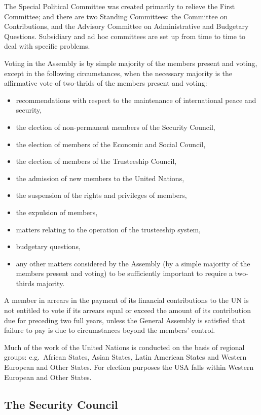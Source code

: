\documentclass[
  openany]{book}
\providecommand{\tightlist}{%
  \setlength{\itemsep}{0pt}\setlength{\parskip}{0pt}}
\begin{document}
The Special Political Committee was created primarily to relieve the First Committee; and there are two Standing Committees: the Committee on Contributions, and the Advisory Committee on Administrative and Budgetary Questions. Subsidiary and ad hoc committees are set up from time to time to deal with specific problems.

Voting in the Assembly is by simple majority of the members present and voting, except in the following circumstances, when the necessary majority is the affirmative vote of two-thrids of the members present and voting:

\begin{itemize}
\tightlist
\item
  recommendations with respect to the maintenance of international peace and security,
\item
  the election of non-permanent members of the Security Council,
\item
  the election of members of the Economic and Social Council,
\item
  the election of members of the Trusteeship Council,
\item
  the admission of new members to the United Nations,
\item
  the suspension of the rights and privileges of members,
\item
  the expulsion of members,
\item
  matters relating to the operation of the trusteeship system,
\item
  budgetary questions,
\item
  any other matters considered by the Assembly (by a simple majority of the members present and voting) to be sufficiently important to require a two-thirds majority.
\end{itemize}

A member in arrears in the payment of its financial contributions to the UN is not entitled to vote if its arrears equal or exceed the amount of its contribution due for preceding two full years, unless the General Assembly is satisfied that failure to pay is due to circumstances beyond the members' control.

Much of the work of the United Nations is conducted on the basis of regional groups: e.g.~African States, Asian States, Latin American States and Western European and Other States. For election purposes the USA falls within Western European and Other States.

\hypertarget{the-security-council}{%
\subsection{The Security Council}\label{the-security-council}}
\end{document}
